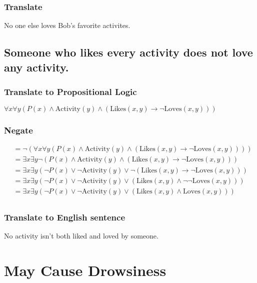 \documentclass[11pt]{article}
\def\imp{\rightarrow}
\begin{document}
\subsubsection{Translate}
No one else loves Bob's favorite activites. 

\subsection{Someone who likes every activity does not love any activity.}
\subsubsection{Translate to Propositional Logic}
$\forall x \forall y (P(x) \land \text{Activity}(y) \land (\text{Likes}(x, y) \imp \neg \text{Loves}(x, y)))$

\subsubsection{Negate}
\begin{align*}
	&= \neg (\forall x \forall y (P(x) \land \text{Activity}(y) \land (\text{Likes}(x, y) \imp \neg \text{Loves}(x, y))))  \\
	&= \exists x \exists y \neg (P(x) \land \text{Activity}(y) \land (\text{Likes}(x, y) \imp \neg \text{Loves}(x, y))) \tag*{Negate Quantifier} \\
	&= \exists x \exists y (\neg P(x) \lor \neg \text{Activity}(y) \lor \neg (\text{Likes}(x, y) \imp \neg \text{Loves}(x, y))) \tag*{DeMorgan's} \\
	&= \exists x \exists y (\neg P(x) \lor \neg \text{Activity}(y) \lor (\text{Likes}(x, y) \land \neg \neg \text{Loves}(x, y))) \tag*{Negate Implication} \\
	&= \exists x \exists y (\neg P(x) \lor \neg \text{Activity}(y) \lor (\text{Likes}(x, y) \land \text{Loves}(x, y))) \tag*{Double Negation} \\
\end{align*}

\subsubsection{Translate to English sentence}
No activity isn't both liked and loved by someone. 

\section{May Cause Drowsiness} %
\end{document}
